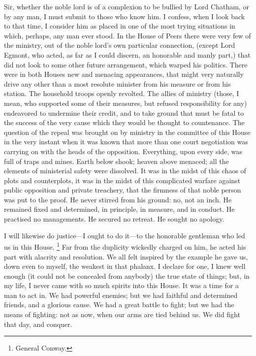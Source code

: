 Sir, whether the noble lord is of a complexion to be bullied by Lord Chatham, or by any man, I must submit to those who know him. I confess, when I look back to that time, I consider him as placed in one of the most trying situations in which, perhaps, any man ever stood. In the House of Peers there were very few of the ministry, out of the noble lord's own particular connection, (except Lord Egmont, who acted, as far as I could discern, an honorable and manly part,) that did not look to some other future arrangement, which warped his politics. There were in both Houses new and menacing appearances, that might very naturally drive any other than a most resolute minister from his measure or from his station. The household troops openly revolted. The allies of ministry (those, I mean, who supported some of their measures, but refused responsibility for any) endeavored to undermine their credit, and to take ground that must be fatal to the success of the very cause which they would be thought to countenance. The question of the repeal was brought on by ministry in the committee of this House in the very instant when it was known that more than one court negotiation was carrying on with the heads of the opposition. Everything, upon every side, was full of traps and mines. Earth below shook; heaven above menaced; all the elements of ministerial safety were dissolved. It was in the midst of this chaos of plots and counterplots, it was in the midst of this complicated warfare against public opposition and private treachery, that the firmness of that noble person was put to the proof. He never stirred from his ground: no, not an inch. He remained fixed and determined, in principle, in measure, and in conduct. He practised no managements. He secured no retreat. He sought no apology.

I will likewise do justice—I ought to do it—to the honorable gentleman who led us in this House.
\footnote{General Conway.}
Far from the duplicity wickedly charged on him, he acted his part with alacrity and resolution. We all felt inspired by the example he gave us, down even to myself, the weakest in that phalanx. I declare for one, I knew well enough (it could not be concealed from anybody) the true state of things; but, in my life, I never came with so much spirits into this House. It was a time for a man to act in. We had powerful enemies; but we had faithful and determined friends, and a glorious cause. We had a great battle to fight; but we had the means of fighting: not as now, when our arms are tied behind us. We did fight that day, and conquer.

